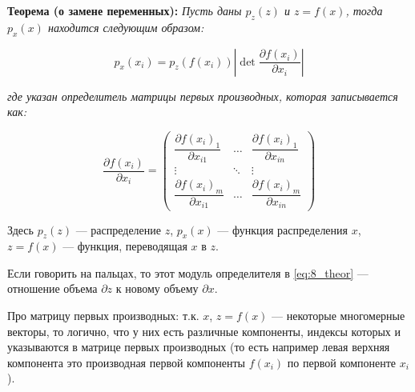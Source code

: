 \textbf{Теорема (о замене переменных):} \textit{Пусть даны $p_z(z)$ и $z = f(x)$, тогда $p_x(x)$ находится следующим образом:}

\begin{equation}
	p_x(x_i) = p_z(f(x_i)) \left|\det\frac{\partial f(x_i)}{\partial x_i}\right|
	\label{eq:8_theor}
\end{equation}

\textit{где указан определитель матрицы первых производных, которая записывается как:}

\begin{equation}
	\frac{\partial f(x_i)}{\partial x_i} = 
		\begin{pmatrix}
			\dfrac{\partial f(x_i)_1}{\partial x_{i1}}& \dots & \dfrac{\partial f(x_i)_1}{\partial x_{in}} \\
			\vdots & \ddots & \vdots \\
			\dfrac{\partial f(x_i)_m}{\partial x_{i1}}& \dots & \dfrac{\partial f(x_i)_m}{\partial x_{in}} 
		\end{pmatrix}
\end{equation}

Здесь $p_z(z)$ --- распределение $z$, $p_x(x)$ --- функция распределения $x$, $z = f(x)$ --- функция, переводящая $x$ в $z$.

Если говорить на пальцах, то этот модуль определителя в \ref{eq:8_theor} --- отношение объема $\partial z$ к новому объему $\partial x$.

Про матрицу первых производных: т.к. $x$, $z = f(x)$ --- некоторые многомерные векторы, то логично, что у них есть различные компоненты, индексы которых и указываются в матрице первых производных (то есть например левая верхняя компонента это производная первой компоненты $f(x_i)$ по первой компоненте $x_i$).